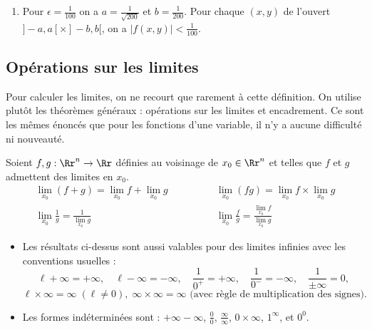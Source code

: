 \documentclass[12pt, class=report,crop=false]{standalone}
\begin{document}
\begin{exemple}
\begin{enumerate}
  
  
  \item Pour $\epsilon = \frac{1}{100}$ on a $a = \frac{1}{\sqrt{200}}$ et $b=\frac{1}{200}$. Pour chaque $(x,y)$ de l'ouvert $]-a,a[ \times ]-b,b[$, on a $|f(x,y)| < \frac{1}{100}$.
\end{enumerate}
  
\end{exemple}

\subsection{Opérations sur les limites}


Pour calculer les limites, on ne recourt que rarement à cette définition. 
On utilise plutôt les théorèmes généraux : opérations sur les limites et encadrement. 
Ce sont les mêmes énoncés que pour les fonctions d'une variable, il n'y a aucune difficulté ni nouveauté. 


\begin{proposition}
Soient $f,g:\Rr^n\to \Rr$ définies au voisinage de $x_0 \in \Rr^n$ et telles que $f$ et $g$ admettent des limites en $x_0$.
$$\begin{array}{ll}
\displaystyle \lim_{x_0}(f+g)=\lim _{x_0}f+\lim _{x_0}g 
\qquad & \qquad 
\displaystyle \lim _{x_0}(fg)=\lim _{x_0}f\times \lim _{x_0}g\\[3ex]
\displaystyle \lim _{x_0}\frac{1}{g}=\frac{1}{\lim _{x_0}g} 
\qquad & \qquad 
\displaystyle \lim _{x_0}\frac{f}{g}=\frac{\lim _{x_0}f}{\lim _{x_0}g}
\end{array}$$
\end{proposition}

\begin{remarque*}
\sauteligne
\begin{itemize}
  \item 
Les résultats ci-dessus sont aussi valables pour des limites infinies avec les conventions usuelles :
$$\ell+\infty =+\infty,\quad \ell-\infty =-\infty,\quad \frac{1}{0^+}=+\infty ,\quad \frac{1}{0^-}=-\infty ,\quad \frac{1}{\pm \infty }=0,$$
$$\ell\times \infty =\infty \; (\ell\neq 0),\; \infty \times \infty =\infty \text{ (avec règle de multiplication des signes).}$$

  \item 
Les formes indéterminées sont : $+\infty -\infty$, $\displaystyle \frac{0}{0}$, 
$\displaystyle \frac{\infty }{\infty}$, $\displaystyle 0\times \infty$, $\displaystyle 1^{\infty}$, et $0^0$.
\end{itemize}
\end{remarque*}
\end{document}
